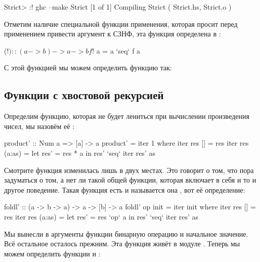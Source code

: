 \begin{code}
Strict> :! ghc --make Strict
[1 of 1] Compiling Strict           ( Strict.hs, Strict.o )
\end{code}

Отметим наличие специальной функции применения, которая
просит перед применением привести аргумент к СЗНФ, эта 
функция определена в :

\begin{code}
($!) :: (a -> b) -> a -> b
 f $! a = a `seq` f a
\end{code}

С этой функцией мы можем определить функцию  так:



\subsection{Функции с хвостовой рекурсией}

Определим функцию, которая не будет лениться при
вычислении произведения чисел, мы назовём её :

\begin{code}
product' :: Num a => [a] -> a
product' = iter 1
    where iter res []        = res
          iter res (a:as)    = let res' = res * a
                               in  res' `seq` iter res' as 
\end{code}

Смотрите функция  изменилась лишь в двух местах. Это
говорит о том, что пора задуматься о том, а нет ли такой
общей функции, которая включает в себя и то и другое поведение.
Такая функция есть и называется она , вот её определение:

\begin{code}
foldl' :: (a -> b -> a) -> a -> [b] -> a
foldl' op init = iter init
    where iter res []        = res
          iter res (a:as)    = let res' = res `op` a
                               in  res' `seq` iter res' as 
\end{code}

Мы вынесли в аргументы функции бинарную операцию и 
начальное значение. Всё остальное осталось прежним.
Эта функция живёт в модуле . Теперь
мы можем определить функции  и :

